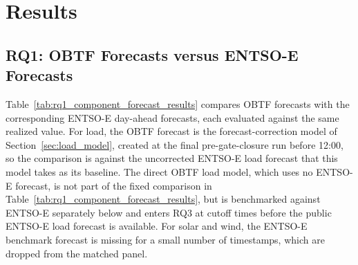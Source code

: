 \section{Results}
\label{sec:results}

\subsection{RQ1: OBTF Forecasts versus \mbox{ENTSO-E} Forecasts}
\label{sec:results_rq1}

Table~\ref{tab:rq1_component_forecast_results} compares OBTF
forecasts with the corresponding \mbox{ENTSO-E} day-ahead forecasts, each
evaluated against the same realized value. For load, the OBTF forecast is
the forecast-correction model of Section~\ref{sec:load_model}, created at the
final pre-gate-closure run before 12:00, so the comparison is against the
uncorrected \mbox{ENTSO-E} load forecast that this model takes as its baseline. The direct OBTF load model, which
uses no \mbox{ENTSO-E} forecast, is not part of the fixed comparison in
Table~\ref{tab:rq1_component_forecast_results}, but is benchmarked against
\mbox{ENTSO-E} separately below and enters RQ3 at cutoff times before the public
\mbox{ENTSO-E} load forecast is available. For solar and wind, the
\mbox{ENTSO-E} benchmark forecast is missing for a small number of timestamps,
which are dropped from the matched panel.

